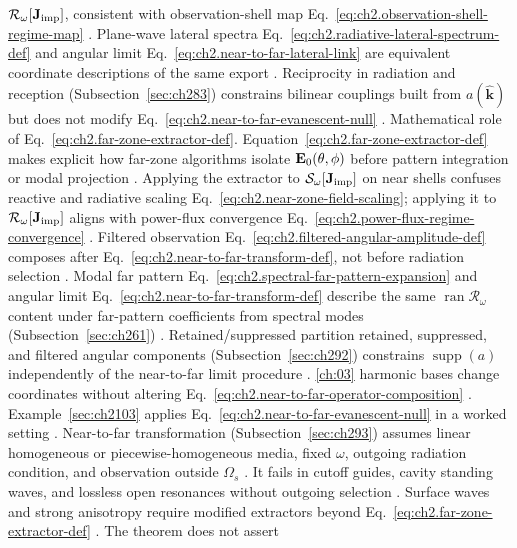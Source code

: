 \(\mathcal{R}_\omega[\mathbf{J}_{\mathrm{imp}}]\), consistent with observation-shell map
Eq.~\eqref{eq:ch2.observation-shell-regime-map} \cite{stratton1941}. Plane-wave lateral spectra
Eq.~\eqref{eq:ch2.radiative-lateral-spectrum-def} and angular limit
Eq.~\eqref{eq:ch2.near-to-far-lateral-link} are equivalent coordinate descriptions of the same
export \cite{jackson1999}. Reciprocity in radiation and reception (Subsection~\ref{sec:ch283}) constrains bilinear couplings built from
\(a(\widehat{\mathbf{k}})\) but does not modify Eq.~\eqref{eq:ch2.near-to-far-evanescent-null}
\cite{stratton1941}. Mathematical role of Eq.~\eqref{eq:ch2.far-zone-extractor-def}. Equation~\eqref{eq:ch2.far-zone-extractor-def} makes explicit how far-zone
algorithms isolate \(\mathbf{E}_0(\theta,\phi)\) before pattern integration or modal projection
\cite{stratton1941}. Applying the extractor to
\(\mathcal{S}_\omega[\mathbf{J}_{\mathrm{imp}}]\) on near shells confuses reactive and radiative scaling
Eq.~\eqref{eq:ch2.near-zone-field-scaling}; applying it to \(\mathcal{R}_\omega[\mathbf{J}_{\mathrm{imp}}]\) aligns
with power-flux convergence Eq.~\eqref{eq:ch2.power-flux-regime-convergence}
\cite{stratton1941}. Filtered observation
Eq.~\eqref{eq:ch2.filtered-angular-amplitude-def} composes after
Eq.~\eqref{eq:ch2.near-to-far-transform-def}, not before radiation selection
\cite{harrington2001}. Modal far pattern Eq.~\eqref{eq:ch2.spectral-far-pattern-expansion} and angular limit
Eq.~\eqref{eq:ch2.near-to-far-transform-def} describe the same \(\operatorname{ran}\mathcal{R}_\omega\)
content under far-pattern coefficients from spectral modes (Subsection~\ref{sec:ch261})
\cite{stratton1941}. Retained/suppressed partition retained, suppressed, and filtered angular components (Subsection~\ref{sec:ch292}) constrains \(\operatorname{supp}(a)\) independently of
the near-to-far limit procedure \cite{stratton1941}. \ref{ch:03} harmonic
bases change coordinates without altering Eq.~\eqref{eq:ch2.near-to-far-operator-composition}
\cite{stratton1941}. Example~\ref{sec:ch2103} applies
Eq.~\eqref{eq:ch2.near-to-far-evanescent-null} in a worked setting \cite{stratton1941}. Near-to-far transformation (Subsection~\ref{sec:ch293}) assumes linear homogeneous or piecewise-homogeneous
media, fixed \(\omega\), outgoing radiation condition, and observation outside \(\Omega_s\)
\cite{stratton1941}. It fails in cutoff guides, cavity standing waves,
and lossless open resonances without outgoing selection \cite{stratton1941}. Surface waves and
strong anisotropy require modified extractors beyond
Eq.~\eqref{eq:ch2.far-zone-extractor-def} \cite{harrington2001}. The theorem does not assert
